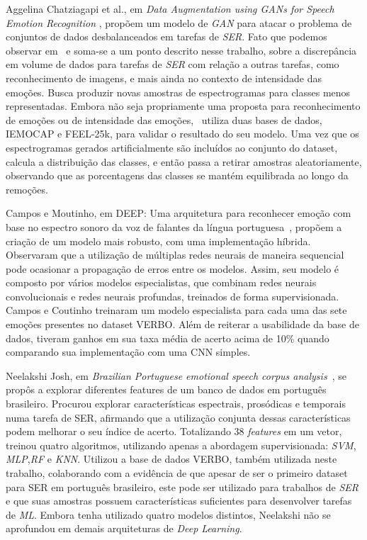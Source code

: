 Aggelina Chatziagapi et al., em \textit{Data Augmentation using GANs for Speech Emotion Recognition }\cite{32.89}, propõem um modelo de \textit{GAN} para atacar o problema de conjuntos de dados desbalanceados em tarefas de \textit{SER}. Fato que podemos observar em~\cite{32.32} e soma-se a um ponto descrito nesse trabalho, sobre a discrepância em volume de dados para tarefas de \textit{SER} com relação a outras tarefas, como reconhecimento de imagens, e mais ainda no contexto de intensidade das emoções. Busca produzir novas amostras de espectrogramas para classes menos representadas. Embora não seja propriamente uma proposta para reconhecimento de emoções ou de intensidade das emoções,~\cite{32.89} utiliza duas bases de dados, IEMOCAP e FEEL-25k, para validar o resultado do seu modelo. Uma vez que os espectrogramas gerados artificialmente são incluídos ao conjunto do dataset, calcula a distribuição das classes, e então passa a retirar amostras aleatoriamente, observando que as porcentagens das classes se mantém equilibrada ao longo da remoções.

Campos e Moutinho, em DEEP: Uma arquitetura para reconhecer emoção com base no espectro sonoro da voz de falantes da língua portuguesa~\cite{12}, propõem a criação de um modelo mais robusto, com uma implementação híbrida. Observaram que a utilização de múltiplas redes neurais de maneira sequencial pode ocasionar a propagação de erros entre os modelos. Assim, seu modelo é composto por vários modelos especialistas, que combinam redes neurais convolucionais e redes neurais profundas, treinados de forma supervisionada. Campos e Coutinho treinaram um modelo especialista para cada uma das sete emoções presentes no dataset VERBO. Além de reiterar a usabilidade da base de dados, tiveram ganhos em sua taxa média de acerto acima de 10\% quando comparando sua implementação com uma CNN simples.

Neelakshi Josh, em \textit{Brazilian Portuguese emotional speech corpus analysis}~\cite{20}, se propôs a explorar diferentes features de um banco de dados em português brasileiro. Procurou explorar características espectrais, prosódicas e temporais numa tarefa de SER, afirmando que a utilização conjunta dessas características podem melhorar o seu índice de acerto. Totalizando 38 \textit{features} em um vetor, treinou quatro algoritmos, utilizando apenas a abordagem supervisionada: \textit{SVM}, \textit{MLP},\textit{RF} e \textit{KNN}. Utilizou a base de dados VERBO, também utilizada neste trabalho, colaborando com a evidência de que apesar de ser o primeiro dataset para SER em português brasileiro, este pode ser utilizado para trabalhos de \textit{SER} e que suas amostras possuem características suficientes para desenvolver tarefas de \textit{ML}. Embora tenha utilizado quatro modelos distintos, Neelakshi não se aprofundou em demais arquiteturas de \textit{Deep Learning}.

